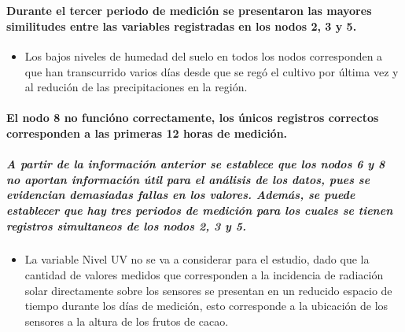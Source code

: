 \documentclass[11pt]{article}
\providecommand{\tightlist}{%
      \setlength{\itemsep}{0pt}\setlength{\parskip}{0pt}}
\begin{document}
    \begin{center}
    \end{center}
    { \hspace*{\fill} \\}
    
    \paragraph{Durante el tercer periodo de medición se presentaron las
mayores similitudes entre las variables registradas en los nodos 2, 3 y
5.}\label{durante-el-tercer-periodo-de-mediciuxf3n-se-presentaron-las-mayores-similitudes-entre-las-variables-registradas-en-los-nodos-2-3-y-5.}

\begin{itemize}
\tightlist
\item
  Los bajos niveles de humedad del suelo en todos los nodos corresponden
  a que han transcurrido varios días desde que se regó el cultivo por
  última vez y al redución de las precipitaciones en la región.
\end{itemize}

\paragraph{El nodo 8 no funcióno correctamente, los únicos registros
correctos corresponden a las primeras 12 horas de
medición.}\label{el-nodo-8-no-funciuxf3no-correctamente-los-uxfanicos-registros-correctos-corresponden-a-las-primeras-12-horas-de-mediciuxf3n.}

    \subparagraph{A partir de la información anterior se establece que los
nodos 6 y 8 no aportan información útil para el análisis de los datos,
pues se evidencian demasiadas fallas en los valores. Además, se puede
establecer que hay tres periodos de medición para los cuales se tienen
registros simultaneos de los nodos 2, 3 y
5.}\label{a-partir-de-la-informaciuxf3n-anterior-se-establece-que-los-nodos-6-y-8-no-aportan-informaciuxf3n-uxfatil-para-el-anuxe1lisis-de-los-datos-pues-se-evidencian-demasiadas-fallas-en-los-valores.-ademuxe1s-se-puede-establecer-que-hay-tres-periodos-de-mediciuxf3n-para-los-cuales-se-tienen-registros-simultaneos-de-los-nodos-2-3-y-5.}

\begin{itemize}
\tightlist
\item
  La variable Nivel UV no se va a considerar para el estudio, dado que
  la cantidad de valores medidos que corresponden a la incidencia de
  radiación solar directamente sobre los sensores se presentan en un
  reducido espacio de tiempo durante los días de medición, esto
  corresponde a la ubicación de los sensores a la altura de los frutos
  de cacao.
\end{itemize}
\end{document}
